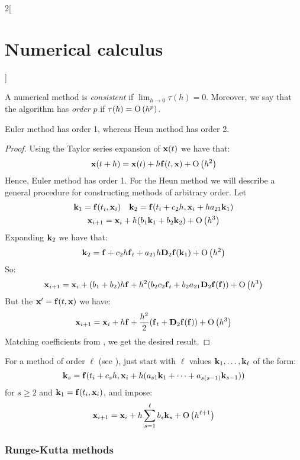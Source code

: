 \documentclass[../../../main_math.tex]{subfiles}
\begin{document}
\begin{multicols}{2}[\section{Numerical calculus}]
\begin{definition}
    A numerical method is \emph{consistent} if $\displaystyle\lim_{h\to 0}\tau(h)=0$. Moreover, we say that the algorithm has \emph{order} $p$ if $\tau(h)=\O{h^p}$.
  \end{definition}
  \begin{lemma}
    Euler method has order 1, whereas Heun method has order 2.
  \end{lemma}
  \begin{proof}
    Using the Taylor series expansion of $\vf{x}(t)$ we have that:
    $$\vf{x}(t+h) = \vf{x}(t)+h\vf{f}(t,\vf{x}) + \O{h^2}$$
    Hence, Euler method has order 1. For the Heun method we will describe a general procedure for constructing methods of arbitrary order. Let
    \begin{gather*}
      \vf{k}_1=\vf{f}(t_i,\vf{x}_i)\quad \vf{k}_2=\vf{f}(t_i+c_2h,\vf{x}_i+ha_{21}\vf{k}_1)\\
      \vf{x}_{i+1}=\vf{x}_i+h(b_1\vf{k}_1+b_2\vf{k}_2)+\O{h^3}
    \end{gather*}
    Expanding $\vf{k}_2$ we have that:
    $$\vf{k}_2=\vf{f}+c_2h\vf{f}_t+a_{21}h\vf{D}_2\vf{f}(\vf{k}_1)+\O{h^2}$$
    So:
    \begin{equation}\label{NC:heun1}
      \vf{x}_{i+1}=\vf{x}_i+(b_1+b_2)h\vf{f}+h^2(b_2c_2\vf{f}_t+b_2a_{21}\vf{D}_2\vf{f}(\vf{f}))+\O{h^3}
    \end{equation}
    But the $\vf{x}'=\vf{f}(t,\vf{x})$ we have:
    \begin{equation}\label{NC:heun2}
      \vf{x}_{i+1}=\vf{x}_i+h\vf{f}+\frac{h^2}{2}(\vf{f}_t+\vf{D}_2\vf{f}(\vf{f}))+\O{h^3}
    \end{equation}
    Matching coefficients from , we get the desired result.
  \end{proof}
  \begin{remark}
    For a method of order $\ell$ (see ), just start with $\ell$ values $\vf{k}_1,\ldots,\vf{k}_\ell$ of the form: $$\vf{k}_s=\vf{f}(t_i+c_sh,\vf{x}_i+h(a_{s1}\vf{k}_1+\cdots+a_{s(s-1)}\vf{k}_{s-1}))$$
    for $s\geq 2$ and $\vf{k}_1=\vf{f}(t_i,\vf{x}_i)$, and impose:
    $$\vf{x}_{i+1}=\vf{x}_i+h\sum_{s=1}^\ell b_s\vf{k}_s+\O{h^{\ell+1}}$$
  \end{remark}
  \subsubsection{Runge-Kutta methods}\label{NC:rungekutta}
\end{multicols}
\end{document}
